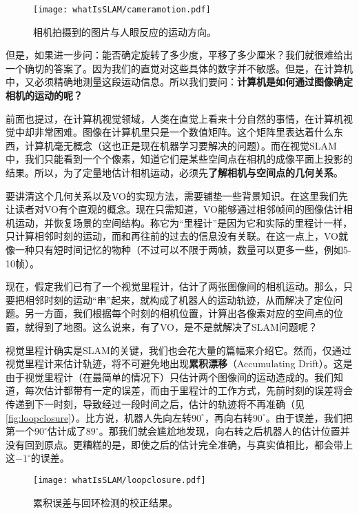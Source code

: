 \begin{figure}[!ht]
	\centering
	\texttt{[image: whatIsSLAM/cameramotion.pdf]}
	\caption{相机拍摄到的图片与人眼反应的运动方向。}
	\label{fig:cameramotion}
\end{figure}

但是，如果进一步问：能否确定旋转了多少度，平移了多少厘米？我们就很难给出一个确切的答案了。因为我们的直觉对这些具体的数字并不敏感。但是，在计算机中，又必须精确地测量这段运动信息。所以我们要问：\textbf{计算机是如何通过图像确定相机的运动的呢？}

前面也提过，在计算机视觉领域，人类在直觉上看来十分自然的事情，在计算机视觉中却非常困难。图像在计算机里只是一个数值矩阵。这个矩阵里表达着什么东西，计算机毫无概念（这也正是现在机器学习要解决的问题）。而在视觉SLAM中，我们只能看到一个个像素，知道它们是某些空间点在相机的成像平面上投影的结果。所以，为了定量地估计相机运动，必须先\textbf{了解相机与空间点的几何关系}。

要讲清这个几何关系以及VO的实现方法，需要铺垫一些背景知识。在这里我们先让读者对VO有个直观的概念。现在只需知道，VO能够通过相邻帧间的图像估计相机运动，并恢复场景的空间结构。称它为“里程计”是因为它和实际的里程计一样，只计算相邻时刻的运动，而和再往前的过去的信息没有关联。在这一点上，VO就像一种只有短时间记忆的物种（不过可以不限于两帧，数量可以更多一些，例如5-10帧）。

现在，假定我们已有了一个视觉里程计，估计了两张图像间的相机运动。那么，只要把相邻时刻的运动“串”起来，就构成了机器人的运动轨迹，从而解决了定位问题。另一方面，我们根据每个时刻的相机位置，计算出各像素对应的空间点的位置，就得到了地图。这么说来，有了VO，是不是就解决了SLAM问题呢？

视觉里程计确实是SLAM的关键，我们也会花大量的篇幅来介绍它。然而，仅通过视觉里程计来估计轨迹，将不可避免地出现\textbf{累积漂移}（Accumulating Drift）。这是由于视觉里程计（在最简单的情况下）只估计两个图像间的运动造成的。我们知道，每次估计都带有一定的误差，而由于里程计的工作方式，先前时刻的误差将会传递到下一时刻，导致经过一段时间之后，估计的轨迹将不再准确（见\autoref{fig:loopclosure}）。比方说，机器人先向左转$90^\circ$，再向右转$90^\circ$。由于误差，我们把第一个$90^\circ$估计成了$89^\circ$。那我们就会尴尬地发现，向右转之后机器人的估计位置并没有回到原点。更糟糕的是，即使之后的估计完全准确，与真实值相比，都会带上这$-1^\circ$的误差。

\begin{figure}[!htp]
	\centering
	\texttt{[image: whatIsSLAM/loopclosure.pdf]}
	\caption{累积误差与回环检测的校正结果\textsuperscript{\cite{Newman2005}}。}
	\label{fig:loopclosure}
\end{figure}

